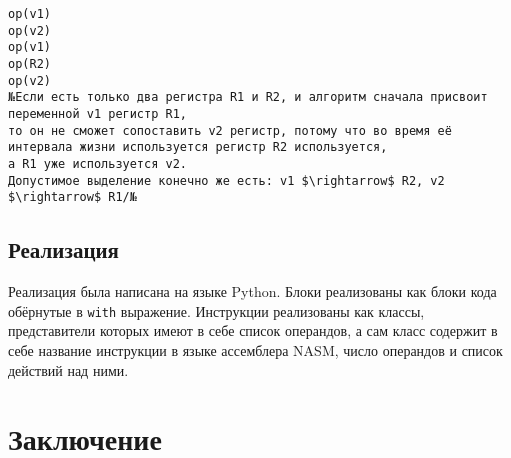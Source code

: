 \documentclass[a4paper,14pt]{extarticle}
\begin{document}
\begin{lstlisting}[caption={Пример кода, в котором алгоритм может не справится}, label=fail_when_possible]
op(v1)
op(v2)
op(v1)
op(R2)
op(v2)
№Если есть только два регистра R1 и R2, и алгоритм сначала присвоит переменной v1 регистр R1,
то он не сможет сопоставить v2 регистр, потому что во время её интервала жизни используется регистр R2 используется,
а R1 уже используется v2.
Допустимое выделение конечно же есть: v1 $\rightarrow$ R2, v2 $\rightarrow$ R1/№
\end{lstlisting}

\subsection{Реализация}
Реализация была написана на языке Python.
Блоки реализованы как блоки кода обёрнутые в \texttt{with} выражение.
Инструкции реализованы как классы, представители которых имеют в себе список операндов,
а сам класс содержит в себе название инструкции в языке ассемблера NASM, число операндов и список действий над ними.

\section{Заключение}

\newpage



\end{document}
